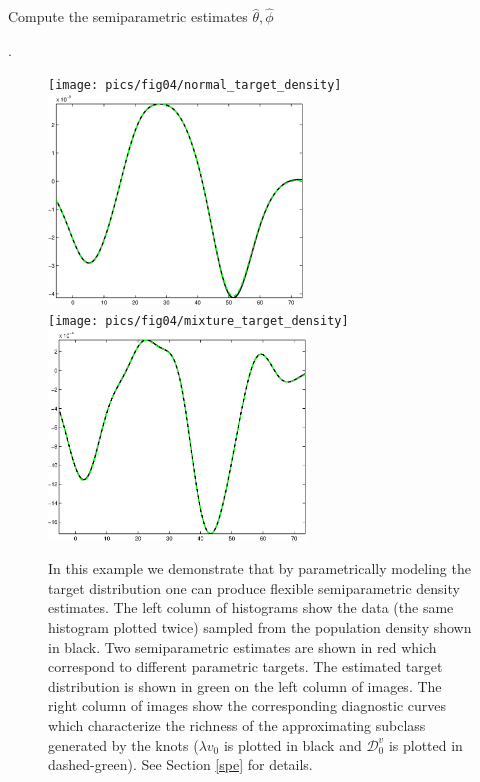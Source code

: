 \documentclass[noinfoline]{imsart}
\begin{document}
\begin{algorithm}[h!]
\caption{Compute the semiparametric estimates $\hat\theta, \hat \phi$}
\label{alg2}
\begin{algorithmic}[1]
.
\end{algorithmic}
\end{algorithm}


\begin{figure}[t]
\centering
\texttt{[image: pics/fig04/normal\_target\_density]}
\includegraphics[height = 2.2in]{pics/fig04/normal_target_agreement0}\\
\texttt{[image: pics/fig04/mixture\_target\_density]}
\includegraphics[height = 2.2in]{pics/fig04/mixture_target_agreement0}
\caption{
In this example we demonstrate that by parametrically modeling the target distribution one can  produce flexible semiparametric density estimates.
The left column of histograms show the data (the same histogram plotted twice) sampled from the population density shown in black. Two semiparametric estimates are shown in red which correspond to different parametric targets. The estimated target distribution is shown in green on the left column of images. The right column of images show the corresponding  diagnostic curves which characterize the richness of the approximating subclass generated by the knots ($\lambda v_0$ is plotted in  black and $\mathcal D_0^v$ is plotted in dashed-green).  See Section \ref{spe} for details.
 \label{f4} }
 \end{figure}
\end{document}
